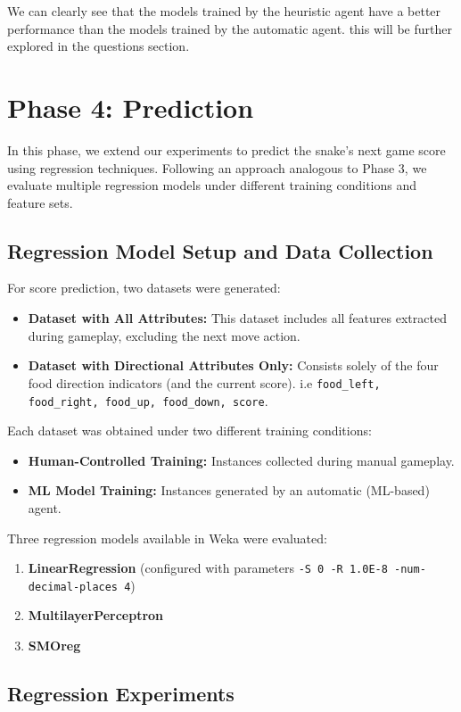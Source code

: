 \documentclass[12pt,a4paper]{article}
\begin{document}
We can clearly see that the models trained by the heuristic agent have a better performance than the models trained by the automatic agent.
this will be further explored in the questions section.

\newpage
\section{Phase 4: Prediction}
In this phase, we extend our experiments to predict the snake’s next game score using regression techniques. Following an approach analogous to Phase 3, we evaluate multiple regression models under different training conditions and feature sets.

\subsection{Regression Model Setup and Data Collection}
For score prediction, two datasets were generated:
\begin{itemize}
    \item \textbf{Dataset with All Attributes:} This dataset includes all features extracted during gameplay, excluding the next move action.
    \item \textbf{Dataset with Directional Attributes Only:} Consists solely of the four food direction indicators (and the current score). i.e \texttt{food\_left, food\_right, food\_up, food\_down, score}.
\end{itemize}
Each dataset was obtained under two different training conditions:
\begin{itemize}
    \item \textbf{Human-Controlled Training:} Instances collected during manual gameplay.
    \item \textbf{ML Model Training:} Instances generated by an automatic (ML-based) agent.
\end{itemize}
Three regression models available in Weka were evaluated:
\begin{enumerate}
    \item \textbf{LinearRegression} (configured with parameters \texttt{-S 0 -R 1.0E-8 -num-decimal-places 4})
    \item \textbf{MultilayerPerceptron}
    \item \textbf{SMOreg}
\end{enumerate}

\subsection{Regression Experiments}
\end{document}
